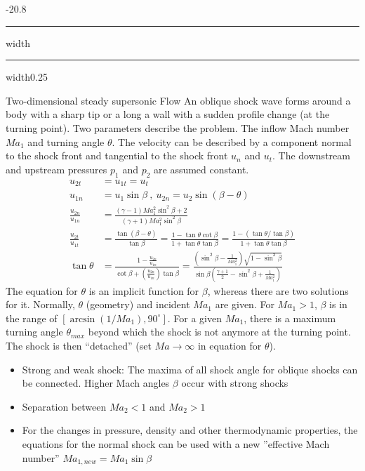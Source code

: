 \documentclass[8pt, landscape, fleqn]{scrartcl}
\makeatletter
\renewcommand{\section}{\@startsection{section}{1}{0mm}%
{-2\baselineskip}{0.8\baselineskip}%
{\hrule depth 0.2pt width\columnwidth\hrule depth1.5pt
width0.25\columnwidth\vspace*{1.2em}\Large\bfseries\rmfamily}}
\makeatother
\begin{document}
\begin{multicols*}{3}
\section{Two-dimensional steady supersonic Flow}
An oblique shock wave forms around a body with a sharp tip or a long a wall with a sudden profile change (at the turning point). Two parameters describe the problem. The inflow Mach number $Ma_1$ and turning angle $\theta$. The velocity can be described by a component normal to the shock front and tangential to the shock front $u_n$ and $u_t$. The downstream and upstream pressures $p_1$ and $p_2$ are assumed constant.
\begin{align*}
    u_{2t} &= u_{1t} = u_t \\
    u_{1n} &= u_1 \sin \beta~,~u_{2n} = u_2 \sin(\beta-\theta) \\
    \frac{u_{2n}}{u_{1n}} &= \frac{(\gamma-1) Ma_1^2 \sin^2 \beta + 2}{(\gamma+1) Ma_1^2 \sin^2 \beta}\\
    \frac{u_{2t}}{u_{1t}} &= \frac{\tan (\beta-\theta)}{\tan \beta} = \frac{1-\tan\theta \cot \beta}{1 + \tan \theta \tan \beta} = \frac{1-(\tan\theta/\tan \beta)}{1 + \tan \theta \tan \beta} \\
    \tan \theta &= \frac{1-\frac{u_{2n}}{u_{1n}}}{\cot \beta + (\frac{u_{2n}}{u_{1n}})\tan \beta} = \frac{\left( \sin^2\beta - \frac{1}{Ma_1^2}\right)\sqrt{ 1- \sin^2 \beta}}{\sin \beta \left( \frac{\gamma+1}{2}-\sin^2 \beta + \frac{1}{Ma_1^2}\right)}
\end{align*}
The equation for $\theta$ is an implicit function for $\beta$, whereas there are two solutions for it. Normally, $\theta$ (geometry) and incident $Ma_1$ are given. For $Ma_1 > 1$, $\beta$ is in the range of $[\arcsin (1/Ma_1), 90^{\circ}]$. For a given $Ma_1$, there is a maximum turning angle $\theta_{max}$ beyond which the shock is not anymore at the turning point. The shock is then ``detached'' (set $Ma \rightarrow \infty$ in equation for $\theta$).
\begin{itemize}
    \item Strong and weak shock: The maxima of all shock angle for oblique shocks can be connected. Higher Mach angles $\beta$ occur with strong shocks
    \item Separation between $Ma_2 < 1$ and $Ma_2 > 1$
    \item For the changes in pressure, density and other thermodynamic properties, the equations for the normal shock can be used with a new ''effective Mach number'' $Ma_{1,new} = Ma_1 \sin \beta$
\end{itemize}

\end{multicols*}
\end{document}
